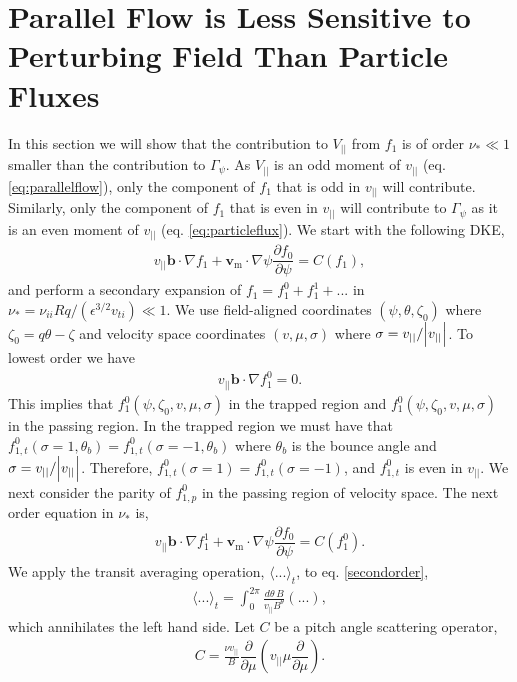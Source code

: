 \documentclass[aip, pop, preprint]{revtex4-1}
\numberwithin{figure}{section}
\numberwithin{equation}{section}
\newcommand{\partder}[2]{\dfrac{\partial  #1}{\partial  #2}} %
\begin{document}
\section{Parallel Flow is Less Sensitive to Perturbing Field Than Particle Fluxes} \label{parallelflow}
In this section we will show that the contribution to $V_{||}$ from $f_1$ is of order $\nu_* \ll 1$ smaller than the contribution to $\Gamma_{\psi}$. As $V_{||}$ is an odd moment of $v_{||}$ (eq. \ref{eq:parallelflow}), only the component of $f_1$ that is odd in $v_{||}$ will contribute. Similarly, only the component of $f_1$ that is even in $v_{||}$ will contribute to $\Gamma_{\psi}$ as it is an even moment of $v_{||}$ (eq. \ref{eq:particleflux}). We start with the following DKE,
\begin{gather}
v_{||} \bm{b} \cdot \nabla f_1 + \bm{v}_{\text{m}} \cdot \nabla \psi \partder{f_0}{\psi} = C(f_1),
\end{gather}
and perform a secondary expansion of $f_1 = f_1^0 + f_1^1 + ...$ in $\nu_* = \nu_{ii} Rq/(\epsilon^{3/2} v_{ti}) \ll 1$. We use field-aligned coordinates $(\psi, \theta, \zeta_0)$ where $\zeta_0 = q \theta - \zeta$ and velocity space coordinates $(v, \mu, \sigma)$ where $\sigma = v_{||}/\abs{v_{||}}$. To lowest order we have
\begin{gather}
v_{||} \bm{b} \cdot \nabla f_1^0 = 0.
\end{gather}
\label{firstorder}
This implies that $f_1^0(\psi, \zeta_0, v, \mu, \sigma)$ in the trapped region and $f_1^0(\psi, \zeta_0, v, \mu, \sigma)$ in the passing region. In the trapped region we must have that $f_{1,t}^0(\sigma = 1, \theta_b) = f_{1,t}^0(\sigma = -1, \theta_b)$ where $\theta_b$ is the bounce angle and $\sigma = v_{||}/\abs{v_{||}}$. Therefore, $f_{1,t}^0(\sigma = 1) = f_{1,t}^0(\sigma = -1)$, and $f_{1,t}^0$ is even in $v_{||}$. We next consider the parity of $f_{1,p}^0$ in the passing region of velocity space. The next order equation in $\nu_*$ is,
\begin{gather}
v_{||} \bm{b} \cdot \nabla f_1^1 + \bm{v}_{\text{m}} \cdot \nabla \psi \partder{f_0}{\psi} = C(f_1^0).
\label{secondorder}
\end{gather}
We apply the transit averaging operation, $\langle ... \rangle_t$, to eq. \ref{secondorder},
\begin{gather}
\langle ... \rangle_t = \int_0^{2\pi} \frac{d \theta \, B}{v_{||} B^{\theta}} (...),
\end{gather}
which annihilates the left hand side. Let $C$ be a pitch angle scattering operator,
\begin{gather}
C = \frac{\nu v_{||}}{B} \partder{}{\mu} \left( v_{||} \mu \partder{}{\mu} \right).
\end{gather}
\end{document}
